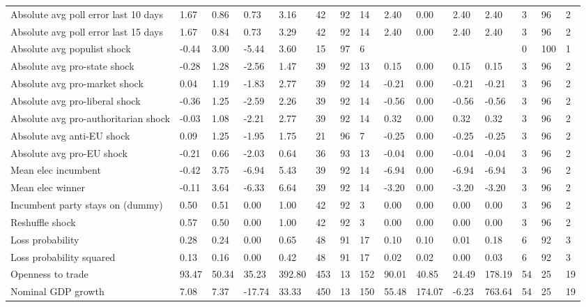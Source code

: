\begin{longtable}{lllllllllllllll}
Absolute avg poll error last 10 days & 1.67 & 0.86 & 0.73 & 3.16 & 42 & 92 & 14 & 2.40 & 0.00 & 2.40 & 2.40 & 3 & 96 & 2\\
Absolute avg poll error last 15 days & 1.67 & 0.84 & 0.73 & 3.29 & 42 & 92 & 14 & 2.40 & 0.00 & 2.40 & 2.40 & 3 & 96 & 2\\
Absolute avg populist shock & -0.44 & 3.00 & -5.44 & 3.60 & 15 & 97 & 6 &  &  &  &  & 0 & 100 & 1\\
Absolute avg pro-state shock & -0.28 & 1.28 & -2.56 & 1.47 & 39 & 92 & 13 & 0.15 & 0.00 & 0.15 & 0.15 & 3 & 96 & 2\\
\addlinespace
Absolute avg pro-market shock & 0.04 & 1.19 & -1.83 & 2.77 & 39 & 92 & 14 & -0.21 & 0.00 & -0.21 & -0.21 & 3 & 96 & 2\\
Absolute avg pro-liberal shock & -0.36 & 1.25 & -2.59 & 2.26 & 39 & 92 & 14 & -0.56 & 0.00 & -0.56 & -0.56 & 3 & 96 & 2\\
Absolute avg pro-authoritarian shock & -0.03 & 1.08 & -2.21 & 2.77 & 39 & 92 & 14 & 0.32 & 0.00 & 0.32 & 0.32 & 3 & 96 & 2\\
Absolute avg anti-EU shock & 0.09 & 1.25 & -1.95 & 1.75 & 21 & 96 & 7 & -0.25 & 0.00 & -0.25 & -0.25 & 3 & 96 & 2\\
Absolute avg pro-EU shock & -0.21 & 0.66 & -2.03 & 0.64 & 36 & 93 & 13 & -0.04 & 0.00 & -0.04 & -0.04 & 3 & 96 & 2\\
\addlinespace
Mean elec incumbent & -0.42 & 3.75 & -6.94 & 5.43 & 39 & 92 & 14 & -6.94 & 0.00 & -6.94 & -6.94 & 3 & 96 & 2\\
Mean elec winner & -0.11 & 3.64 & -6.33 & 6.64 & 39 & 92 & 14 & -3.20 & 0.00 & -3.20 & -3.20 & 3 & 96 & 2\\
Incumbent party stays on (dummy) & 0.50 & 0.51 & 0.00 & 1.00 & 42 & 92 & 3 & 0.00 & 0.00 & 0.00 & 0.00 & 3 & 96 & 2\\
Reshuffle shock & 0.57 & 0.50 & 0.00 & 1.00 & 42 & 92 & 3 & 0.00 & 0.00 & 0.00 & 0.00 & 3 & 96 & 2\\
Loss probability & 0.28 & 0.24 & 0.00 & 0.65 & 48 & 91 & 17 & 0.10 & 0.10 & 0.01 & 0.18 & 6 & 92 & 3\\
\addlinespace
Loss probability squared & 0.13 & 0.16 & 0.00 & 0.42 & 48 & 91 & 17 & 0.02 & 0.02 & 0.00 & 0.03 & 6 & 92 & 3\\
Openness to trade & 93.47 & 50.34 & 35.23 & 392.80 & 453 & 13 & 152 & 90.01 & 40.85 & 24.49 & 178.19 & 54 & 25 & 19\\
Nominal GDP growth & 7.08 & 7.37 & -17.74 & 33.33 & 450 & 13 & 150 & 55.48 & 174.07 & -6.23 & 763.64 & 54 & 25 & 19\\

\end{longtable}

